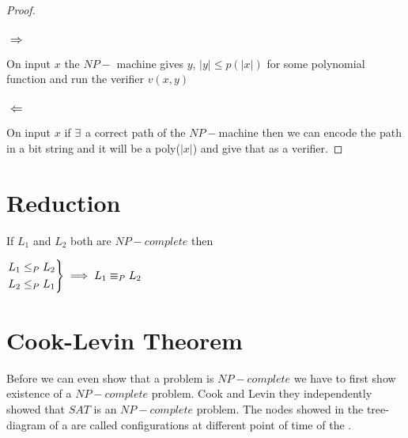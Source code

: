 \documentclass{article}
\begin{document}
\begin{proof}
\subsubsection*{$\Longrightarrow$}
On input $x$ the $NP-$ machine gives $y$, $|y|\leq p(|x|)$ for some polynomial function and run the verifier $v(x,y)$
\subsubsection*{$\Longleftarrow$}
On input $x$ if $\exists$ a correct path of the $NP-$machine then we can encode the path in a bit string and it will be a poly($|x|$) and give that as a verifier.
\end{proof}
\section{Reduction}

If $L_1$ and $L_2$ both are $NP-complete$ then \begin{center}
$	\begin{rcases}
		L_1\leq_P L_2\\
		L_2\leq_P L_1
	\end{rcases}\implies L_1 \equiv_P L_2$
\end{center}
	
	\section{Cook-Levin Theorem}
	Before we can even show that a problem is $NP-complete$ we have to first show existence of a $NP-complete $ problem. Cook and Levin they independently showed that $SAT$ is an $NP-complete $ problem.
	The nodes showed in the tree-diagram of a \ntm are called configurations at different point of time of the \ntm.
	
\end{document}

